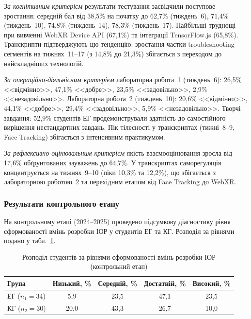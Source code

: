 \textit{За когнітивним критерієм} результати тестування засвідчили поступове зростання: середній бал від 38,5\% на початку до 62,7\% (тиждень~6), 71,4\% (тиждень~10), 74,8\% (тиждень~14), 78,3\% (тиждень~17). Найбільші труднощі~--при вивченні WebXR Device API (67,1\%) та інтеграції TensorFlow.js (65,8\%). Транскрипти підтверджують цю тенденцію: зростання частки troubleshooting-сегментів на тижнях~11--17 (з 14,8\% до 21,3\%) збігається з переходом до найскладніших технологій.

\textit{За операційно-діяльнісним критерієм} лабораторна робота~1 (тиждень~6): 26,5\% <<відмінно>>, 47,1\% <<добре>>, 23,5\% <<задовільно>>, 2,9\% <<незадовільно>>. Лабораторна робота~2 (тиждень~10): 20,6\% <<відмінно>>, 44,1\% <<добре>>, 29,4\% <<задовільно>>, 5,9\% <<незадовільно>>. Творчі завдання: 52,9\% студентів ЕГ продемонстрували здатність до самостійного вирішення нестандартних завдань. Пік тілесності у транскриптах (тижні~8--9, Face Tracking) збігається з інтенсивним практикумом.

\textit{За рефлексивно-оцінювальним критерієм} якість взаємооцінювання зросла від 17,6\% обґрунтованих зауважень до 64,7\%. У транскриптах саморегуляція концентрується на тижнях~9--10 (піки 10,3\% та 12,2\%), що збігається з лабораторною роботою~2 та перехідним етапом від Face Tracking до WebXR.


\subsubsection{Результати контрольного етапу}


На контрольному етапі (2024--2025) проведено підсумкову діагностику рівня сформованості вмінь розробки ІОР у студентів ЕГ та КГ. Розподіл за рівнями подано у табл.~\ref{tab:kontrol}.

\begin{table}[!h]
\caption{Розподіл студентів за рівнями сформованості вмінь розробки ІОР (контрольний етап)}
\label{tab:kontrol}
\centering
\begin{tabular}{|l|c|c|c|c|}
\hline
\textbf{Група} & \textbf{Низький, \%} & \textbf{Середній, \%} & \textbf{Достатній, \%} & \textbf{Високий, \%} \\
\hline
ЕГ ($n_1 = 34$) & 5,9 & 23,5 & 47,1 & 23,5 \\
\hline
КГ ($n_2 = 30$) & 20,0 & 43,3 & 26,7 & 10,0 \\
\hline
\end{tabular}
\end{table}

